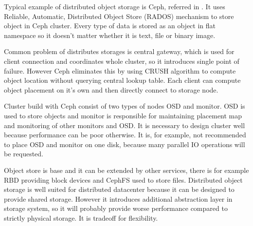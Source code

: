 Typical example of distributed object storage is Ceph, referred in \cite{ceph}. It uses Reliable, Automatic, Distributed Object Store (\Ac{RADOS}) mechanism to store object in Ceph cluster. Every type of data is stored as an object in flat namespace so it doesn't matter whether it is text, file or binary image. 

Common problem of distributes storages is central gateway, which is used for client connection and coordinates whole cluster, so it introduces single point of failure. However Ceph eliminates this by using \Ac{CRUSH} algorithm to compute object location without querying central lookup table. Each client can compute object placement on it's own and then directly connect to storage node.

Cluster build with Ceph consist of two types of nodes \Ac{OSD} and monitor. \Ac{OSD} is used to store objects and monitor is responsible for maintaining placement map and monitoring of other monitors and \Ac{OSD}. It is necessary to design cluster well because performance can be poor otherwise. It is, for example, not recommended to place \Ac{OSD} and monitor on one disk, because many parallel \Ac{IO} operations will be requested.

Object store is base and it can be extended by other services, there is for example \Ac{RBD} providing block devices and CephFS used to store files. Distributed object storage is well suited for distributed datacenter because it can be designed to provide shared storage. However it introduces additional abstraction layer in storage system, so it will probably provide worse performance compared to strictly physical storage. It is tradeoff for flexibility.




